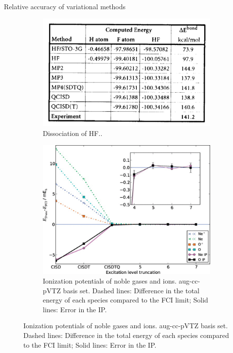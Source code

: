 \documentclass[aspectratio=169]{beamer}
\begin{document}
    \begin{frame}{Relative accuracy of variational methods}
\begin{figure}
    \centering
    \begin{subfigure}{0.45\textwidth}
    \includegraphics[width=\linewidth]{lectures/figures/3_dissociation_of_HF.png}
    \caption{Dissociation of HF.\cite{foresmanExploringChemistryElectronic1996}.}
    \end{subfigure}
    \begin{subfigure}{0.5\textwidth}
        \includegraphics[width=0.8\linewidth]{lectures/figures/3_ionization_potentials.png}
    \caption{Ionization potentials of noble gases and ions. aug-cc-pVTZ basis set. Dashed lines: Difference in the total energy of each species compared to the FCI limit; Solid lines: Error in the IP.\cite{boothApproachingChemicalAccuracy2010}}
    \end{subfigure}
        
\end{figure}
        
    \end{frame}
\end{document}
